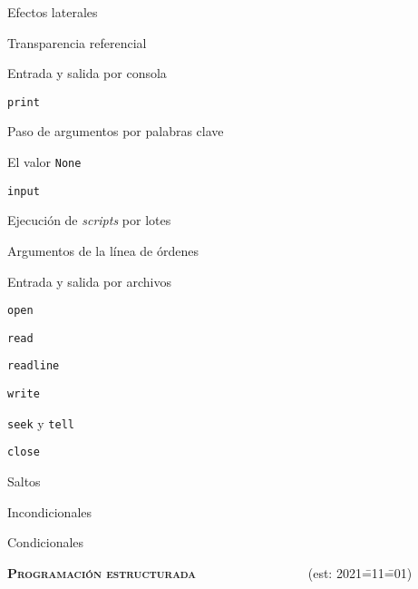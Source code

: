 \begin{longenum}
\begin{longenum}
\begin{longenum}
            \item Efectos laterales
            \item Transparencia referencial
            \item Entrada y salida por consola
            \begin{longenum}
                \item \texttt{print}
                \begin{longenum}
                    \item Paso de argumentos por palabras clave
                    \item El valor \texttt{None}
                \end{longenum}
                \item \texttt{input}
            \end{longenum}
            \item Ejecución de \textit{scripts} por lotes
            \begin{longenum}
                \item Argumentos de la línea de órdenes
            \end{longenum}
            \item Entrada y salida por archivos
            \begin{longenum}
                \item \texttt{open}
                \item \texttt{read}
                \item \texttt{readline}
                \item \texttt{write}
                \item \texttt{seek} y \texttt{tell}
                \item \texttt{close}
            \end{longenum}
        \end{longenum}
        \item Saltos
        \begin{longenum}
            \item Incondicionales
            \item Condicionales
        \end{longenum}
    \end{longenum}
    \item \textbf{\textsc{Programación estructurada}} \ \ \ \ \ \ \ \ \ \ \ \ \ \ \ \ \ (est: 2021\==11\==01)

\end{longenum}
